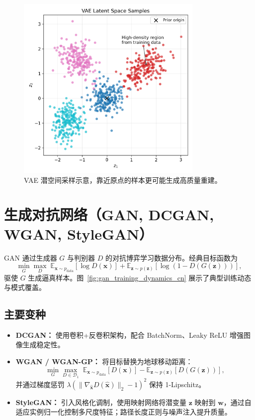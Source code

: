 \documentclass[UTF8,zihao=-4]{ctexart}
\begin{document}
\begin{figure}[H]
  \centering
  \includegraphics[width=0.8\textwidth]{vae_latent_space.png}
  \caption{VAE 潜空间采样示意，靠近原点的样本更可能生成高质量重建。}
  \label{fig:vae_latent_space_cn}
\end{figure}
\FloatBarrier

\section{生成对抗网络（GAN, DCGAN, WGAN, StyleGAN）}
GAN 通过生成器 $G$ 与判别器 $D$ 的对抗博弈学习数据分布。经典目标函数为
\begin{equation}
  \min_{G} \max_{D} \; \mathbb{E}_{\mathbf{x} \sim p_{\mathrm{data}}}[\log D(\mathbf{x})] + \mathbb{E}_{\mathbf{z} \sim p(\mathbf{z})}[\log (1 - D(G(\mathbf{z})))],
\end{equation}
驱使 $G$ 生成逼真样本。图~\ref{fig:gan_training_dynamics_cn} 展示了典型训练动态与模式覆盖。

\subsection{主要变种}
\begin{itemize}
  \item \textbf{DCGAN：} 使用卷积+反卷积架构，配合 BatchNorm、Leaky ReLU 增强图像生成稳定性。
  \item \textbf{WGAN / WGAN-GP：} 将目标替换为地球移动距离：
  \begin{equation}
    \min_{G} \max_{D \in \mathcal{D}_1} \; \mathbb{E}_{\mathbf{x} \sim p_{\mathrm{data}}}[D(\mathbf{x})] - \mathbb{E}_{\mathbf{z} \sim p(\mathbf{z})}[D(G(\mathbf{z}))],
  \end{equation}
  并通过梯度惩罚 $\lambda (\|\nabla_{\hat{\mathbf{x}}} D(\hat{\mathbf{x}})\|_2 - 1)^2$ 保持 1-Lipschitz。
  \item \textbf{StyleGAN：} 引入风格化调制，使用映射网络将潜变量 $\mathbf{z}$ 映射到 $\mathbf{w}$，通过自适应实例归一化控制多尺度特征；路径长度正则与噪声注入提升质量。
\end{itemize}
\end{document}
